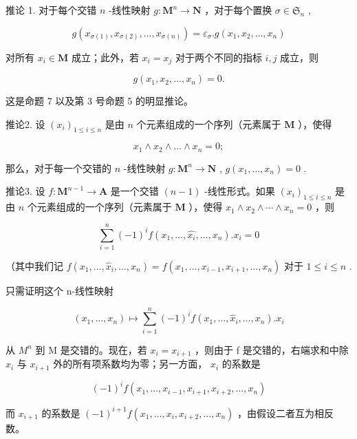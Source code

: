 推论 1. 对于每个交错 \(n\) -线性映射 \(g: \mathbf{M}^n \to \mathbf{N}\) ，对于每个置换 \(\sigma \in \mathfrak{S}_n\) ,

\[
g \left(x _ {\sigma (1)}, x _ {\sigma (2)}, \dots , x _ {\sigma (n)}\right) = \varepsilon_ {\sigma}. g \left(x _ {1}, x _ {2}, \dots , x _ {n}\right)\tag{10}
\]

对所有 \(x_{i} \in \mathbf{M}\) 成立；此外，若 \(x_{i} = x_{j}\) 对于两个不同的指标 \(i, j\) 成立，则

\[
g (x _ {1}, x _ {2}, \dots , x _ {n}) = 0.
\]

这是命题 7 以及第 3 号命题 5 的明显推论。

推论2. 设 \((x_{i})_{1\leqslant i\leqslant n}\) 是由 \(n\) 个元素组成的一个序列（元素属于 \(\mathbf{M}\) ），使得

\[
x _ {1} \wedge x _ {2} \wedge \dots \wedge x _ {n} = 0;
\]

那么，对于每一个交错的 \(n\) -线性映射 \(g: \mathbf{M}^n \to \mathbf{N}\) , \(g(x_1, \ldots, x_n) = 0\) .

推论3. 设 \(f: \mathbf{M}^{n-1} \to \mathbf{A}\) 是一个交错 \((n-1)\) -线性形式。如果 \((x_i)_{1 \leq i \leq n}\) 是由 \(n\) 个元素组成的一个序列（元素属于 \(\mathbf{M}\) ），使得 \(x_1 \wedge x_2 \wedge \cdots \wedge x_n = 0\) ，则

\[
\sum_ {i = 1} ^ {n} (- 1) ^ {i} f (x _ {1}, \dots , \hat {x _ {i}}, \dots , x _ {n}). x _ {i} = 0\tag{11}
\]

（其中我们记 \(f(x_{1},\ldots ,\hat{x}_{i},\ldots ,x_{n}) = f(x_{1},\ldots ,x_{i - 1},x_{i + 1},\ldots ,x_{n})\) 对于 \(1\leqslant i\leqslant n\) .

只需证明这个 n-线性映射

\[
(x _ {1}, \dots , x _ {n}) \mapsto \sum_ {i = 1} ^ {n} (- 1) ^ {i} f (x _ {1}, \dots , \hat {x} _ {i}, \dots , x _ {n}). x _ {i}
\]

从 \(M^{n}\) 到 M 是交错的。现在，若 \(x_{i} = x_{i+1}\) ，则由于 f 是交错的，右端求和中除 \(x_{i}\) 与 \(x_{i+1}\) 外的所有项系数均为零；另一方面， \(x_{i}\) 的系数是

\[
(- 1) ^ {i} f (x _ {1}, \dots , x _ {i - 1}, x _ {i + 1}, x _ {i + 2}, \dots , x _ {n})
\]

而 \(x_{i+1}\) 的系数是 \((-1)^{i+1}f(x_1, \ldots, x_i, x_{i+2}, \ldots, x_n)\) ，由假设二者互为相反数。

